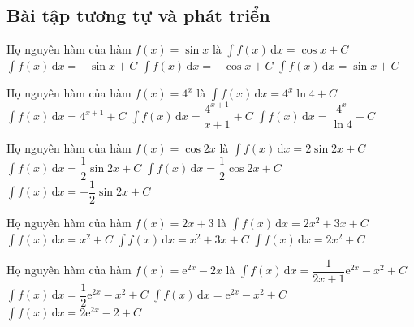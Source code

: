 \subsection{Bài tập tương tự và phát triển}
\begin{ex}%
	Họ nguyên hàm của hàm $f(x) = \sin {x}$ là 
	\choice
	{$\displaystyle\int f(x) \mathrm{\,d}x = \cos {x} + C$}	
	{$\displaystyle\int f(x) \mathrm{\,d}x = -\sin {x} + C$}
	{\True $\displaystyle\int f(x) \mathrm{\,d}x = -\cos {x} + C$}
	{$\displaystyle\int f(x) \mathrm{\,d}x = \sin {x} + C$}
\end{ex}
\begin{ex}%
	Họ nguyên hàm của hàm $f(x) = 4^{x}$ là 
	\choice
	{$\displaystyle\int f(x) \mathrm{\,d}x = 4^{x} \ln {4} + C$}	
	{$\displaystyle\int f(x) \mathrm{\,d}x = 4^{x+1} + C$}
	{ $\displaystyle\int f(x) \mathrm{\,d}x = \dfrac {4^{x+1}}{x+1} + C$}
	{\True $\displaystyle\int f(x) \mathrm{\,d}x = \dfrac {4^{x}}{\ln {4}} + C$}
\end{ex}
\begin{ex}%
	Họ nguyên hàm của hàm $f(x) = \cos {2x}$ là 
	\choice
	{$\displaystyle\int f(x) \mathrm{\,d}x = 2\sin {2x} + C$}	
	{\True $\displaystyle\int f(x) \mathrm{\,d}x = \dfrac{1}{2} \sin{2x} + C$}
	{$\displaystyle\int f(x) \mathrm{\,d}x = \dfrac {1}{2} \cos {2x} + C$}
	{$\displaystyle\int f(x) \mathrm{\,d}x = -\dfrac{1}{2} \sin {2x} + C$}
\end{ex}
\begin{ex}%
Họ nguyên hàm của hàm $f(x) = 2x +3$ là 
\choice
{$\displaystyle\int f(x) \mathrm{\,d}x = 2x^2+3x + C$}	
{$\displaystyle\int f(x) \mathrm{\,d}x = x^2 + C$}
{\True $\displaystyle\int f(x) \mathrm{\,d}x = x^2+3x + C$}
{$\displaystyle\int f(x) \mathrm{\,d}x = 2x^2 + C$}
\end{ex}
\begin{ex}%
Họ nguyên hàm của hàm $f(x) = \mathrm{e}^{2x} -2x$ là 
\choice
{$\displaystyle\int f(x) \mathrm{\,d}x = \dfrac {1}{2x+1} \mathrm {e}^{2x} - x^2 + C$}	
{\True $\displaystyle\int f(x) \mathrm{\,d}x = \dfrac {1}{2} \mathrm {e}^{2x} - x^2 + C$}
{$\displaystyle\int f(x) \mathrm{\,d}x = \mathrm {e}^{2x} - x^2 + C$}
{$\displaystyle\int f(x) \mathrm{\,d}x = 2 \mathrm {e}^{2x} - 2 + C$}
\end{ex}
